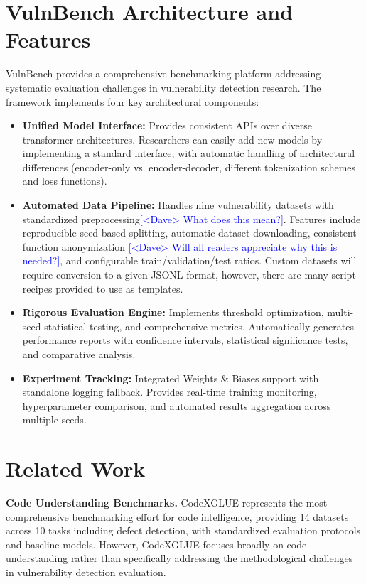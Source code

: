 \documentclass[letterpaper]{article}
\newcommand{\note}[2][red]{\textcolor{#1}{#2}}
\newcommand{\notedme}[1]{\note[blue]{[<Dave> #1]}}
\newcommand{\change}[2][]{\textcolor{orange}{#2}}
\begin{document}
\section{VulnBench Architecture and Features}

VulnBench provides a comprehensive benchmarking platform addressing systematic evaluation challenges in vulnerability detection research. The framework implements four key architectural components:

\begin{itemize}
	\item \textbf{Unified Model Interface:} Provides consistent APIs over diverse transformer architectures. Researchers can easily add new models by implementing a standard interface, with automatic handling of architectural differences (encoder-only vs. encoder-decoder, different tokenization schemes and loss functions).
	\item \textbf{Automated Data Pipeline:} Handles nine vulnerability datasets with standardized preprocessing\notedme{What does this mean?}. Features include reproducible seed-based splitting, automatic dataset downloading, consistent function anonymization \notedme{Will all readers appreciate why this is needed?}, and configurable train/validation/test ratios. Custom datasets will require conversion to a given JSONL format, however, there are many script recipes provided to use as templates.
	\item \textbf{Rigorous Evaluation Engine:} Implements threshold optimization, multi-seed statistical testing, and comprehensive metrics. Automatically generates performance reports with confidence intervals, statistical significance tests, and comparative analysis.
	\item \textbf{Experiment Tracking:} Integrated Weights \& Biases support with standalone logging fallback. Provides real-time training monitoring, hyperparameter comparison, and automated results aggregation across multiple seeds.

\end{itemize}
\section{Related Work}

\textbf{\change[General ]{}Code Understanding Benchmarks.} CodeXGLUE \citep{lu2021codexglue} represents the most comprehensive benchmarking effort for code intelligence, providing 14 datasets across 10 tasks including defect detection, with standardized evaluation protocols and baseline models. However, CodeXGLUE focuses broadly on code understanding rather than specifically addressing the methodological challenges in vulnerability detection evaluation.
\end{document}

